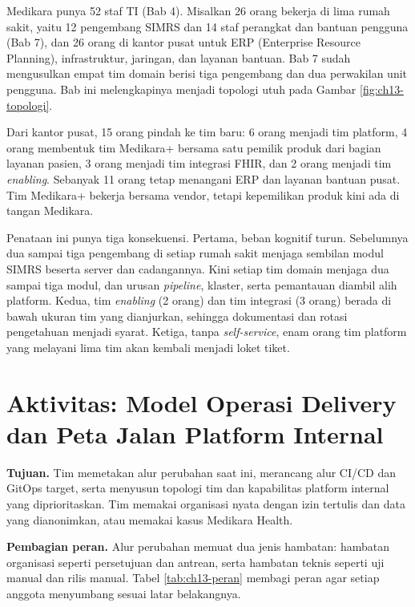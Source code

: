 \begin{kasus}[title={Kasus Medikara Health: Dari Tim TI per Rumah Sakit ke Tim Stream-Aligned dan Tim Platform}]
  Medikara punya 52 staf TI (Bab 4). Misalkan 26 orang bekerja di lima rumah sakit, yaitu 12
  pengembang SIMRS dan 14 staf perangkat dan bantuan pengguna (Bab 7), dan 26 orang di kantor
  pusat untuk ERP (Enterprise Resource Planning), infrastruktur, jaringan, dan layanan bantuan.
  Bab 7 sudah mengusulkan empat tim domain berisi tiga pengembang dan dua perwakilan unit
  pengguna. Bab ini melengkapinya menjadi topologi utuh pada Gambar \ref{fig:ch13-topologi}.

  Dari kantor pusat, 15 orang pindah ke tim baru: 6 orang menjadi tim platform, 4 orang membentuk
  tim Medikara+ bersama satu pemilik produk dari bagian layanan pasien, 3 orang menjadi tim
  integrasi FHIR, dan 2 orang menjadi tim \textit{enabling}. Sebanyak 11 orang tetap menangani ERP
  dan layanan bantuan pusat. Tim Medikara+ bekerja bersama vendor, tetapi kepemilikan produk kini
  ada di tangan Medikara.

  Penataan ini punya tiga konsekuensi. Pertama, beban kognitif turun. Sebelumnya dua sampai tiga
  pengembang di setiap rumah sakit menjaga sembilan modul SIMRS beserta server dan cadangannya.
  Kini setiap tim domain menjaga dua sampai tiga modul, dan urusan \textit{pipeline}, klaster,
  serta pemantauan diambil alih platform. Kedua, tim \textit{enabling} (2 orang) dan tim
  integrasi (3 orang) berada di bawah ukuran tim yang dianjurkan, sehingga dokumentasi dan rotasi
  pengetahuan menjadi syarat. Ketiga, tanpa \textit{self-service}, enam orang tim platform yang
  melayani lima tim akan kembali menjadi loket tiket.
\end{kasus}

\section{Aktivitas: Model Operasi Delivery dan Peta Jalan Platform Internal}
\label{sec:ch13-aktivitas}

\textbf{Tujuan.} Tim memetakan alur perubahan saat ini, merancang alur CI/CD dan GitOps target,
serta menyusun topologi tim dan kapabilitas platform internal yang diprioritaskan. Tim memakai
organisasi nyata dengan izin tertulis dan data yang dianonimkan, atau memakai kasus Medikara
Health.

\textbf{Pembagian peran.} Alur perubahan memuat dua jenis hambatan: hambatan organisasi seperti
persetujuan dan antrean, serta hambatan teknis seperti uji manual dan rilis manual. Tabel
\ref{tab:ch13-peran} membagi peran agar setiap anggota menyumbang sesuai latar belakangnya.

